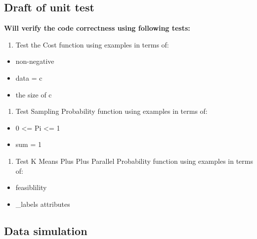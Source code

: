 \documentclass{article}
\begin{document}
    \subsection{Draft of unit test}\label{draft-of-unit-test}

    \textbf{Will verify the code correctness using following tests:}

\begin{enumerate}
\def\labelenumi{\arabic{enumi}.}
\itemsep1pt\parskip0pt
\item
  Test the Cost function using examples in terms of:
\end{enumerate}

\begin{itemize}
\itemsep1pt\parskip0pt
\item
  non-negative
\item
  data = c
\item
  the size of c
\end{itemize}

\begin{enumerate}
\def\labelenumi{\arabic{enumi}.}
\setcounter{enumi}{1}
\itemsep1pt\parskip0pt
\item
  Test Sampling Probability function using examples in terms of:
\end{enumerate}

\begin{itemize}
\itemsep1pt\parskip0pt
\item
  0 \textless{}= Pi \textless{}= 1
\item
  sum = 1
\end{itemize}

\begin{enumerate}
\def\labelenumi{\arabic{enumi}.}
\setcounter{enumi}{2}
\itemsep1pt\parskip0pt
\item
  Test K Means Plus Plus Parallel Probability function using examples in
  terms of:
\end{enumerate}

\begin{itemize}
\itemsep1pt\parskip0pt
\item
  feasiblility
\item
  \_labels attributes
\end{itemize}

    \subsection{Data simulation}\label{data-simulation}
\end{document}
